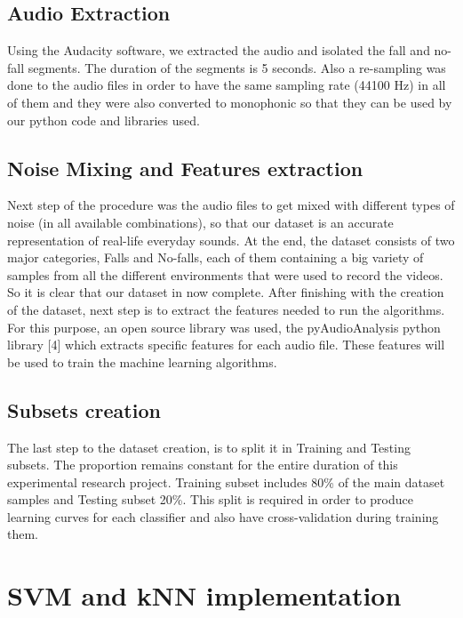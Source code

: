 \documentclass{article}
\begin{document}
\subsection{Audio Extraction}

Using the Audacity software, we extracted the audio and isolated the fall and no-fall segments. The duration of the segments is 5 seconds. Also a re-sampling was done to the audio files in order to have the same sampling rate (44100 Hz) in all of them and they were also converted to monophonic so that they can be used by our python code and libraries used.

\subsection{Noise Mixing and Features extraction}

Next step of the procedure was the audio files to get mixed with different types of noise (in all available combinations), so that our dataset is an accurate representation of real-life everyday sounds. At the end, the dataset consists of two major categories, Falls and No-falls, each of them containing a big variety of samples from all the different environments that were used to record the videos. So it is clear that our dataset in now complete. After finishing with the creation of the dataset, next step is to extract the features needed to run the algorithms. For this purpose, an open source library was used, the pyAudioAnalysis python library [4] which extracts specific features for each audio file. These features will be used to train the machine learning algorithms.

\subsection{Subsets creation}

The last step to the dataset creation, is to split it in Training and Testing subsets. The proportion remains constant for the entire duration of this experimental research project. Training subset includes 80\% of the main dataset samples and Testing subset 20\%. This split is required in order to produce learning curves for each classifier and also have cross-validation during training them.

\section{SVM and kNN implementation}
\end{document}
